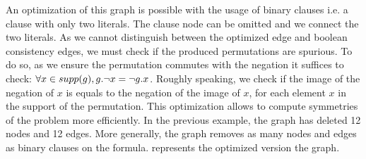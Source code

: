 %
%
%
%

An optimization of this graph is possible with the usage of binary clauses i.e. a clause with only two literals.
The clause node can be omitted and we connect the two literals. As we cannot distinguish between the optimized edge 
and boolean consistency edges, we must check if the produced permutations are spurious. 
To do so, as we ensure the permutation commutes with the negation it suffices to check:
$\forall x \in supp(g), g.\neg x = \neg g.x$.
Roughly speaking, we check if the image of the negation of $x$ is equals to the negation of the image of $x$,
for each element $x$ in the support of the permutation.
This optimization allows to compute symmetries of the problem more efficiently.
In the previous example, the graph has deleted 12 nodes and 12 edges. More generally,
the graph removes as many nodes and edges as binary clauses on the formula.
 represents the optimized version the graph.
